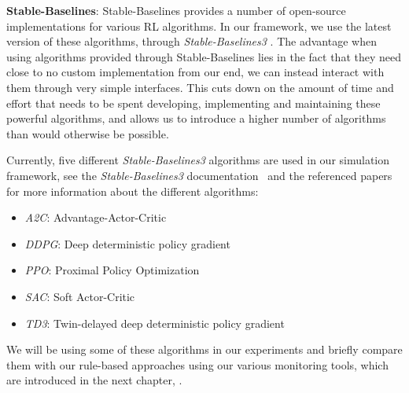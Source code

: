 \medskip
\noindent\textbf{Stable-Baselines}:\label{item:StableBaselines} Stable-Baselines provides a number of open-source implementations for various RL algorithms. In our framework, we use the latest version of these algorithms, through \emph{Stable-Baselines3} \cite{StableBaselines3}. The advantage when using algorithms provided through Stable-Baselines lies in the fact that they need close to no custom implementation from our end, we can instead interact with them through very simple interfaces. This cuts down on the amount of time and effort that needs to be spent developing, implementing and maintaining these powerful algorithms, and allows us to introduce a higher number of algorithms than would otherwise be possible.

Currently, five different \emph{Stable-Baselines3} algorithms are used in our simulation framework, see the \emph{Stable-Baselines3} documentation~\cite{StableBaselines3Algorithms} and the referenced papers for more information about the different algorithms:
\begin{itemize}
	\item \emph{A2C}: Advantage-Actor-Critic \cite{StableBaselines3A2C}
	\item \emph{DDPG}: Deep deterministic policy gradient \cite{StableBaselines3DDPG}
	\item \emph{PPO}: Proximal Policy Optimization \cite{StableBaselines3PPO}
	\item \emph{SAC}: Soft Actor-Critic \cite{StableBaselines3SAC}
	\item \emph{TD3}: Twin-delayed deep deterministic policy gradient \cite{StableBaselines3TD3}
\end{itemize}
We will be using some of these algorithms in our experiments and briefly compare them with our rule-based approaches using our various monitoring tools, which are introduced in the next chapter, .
